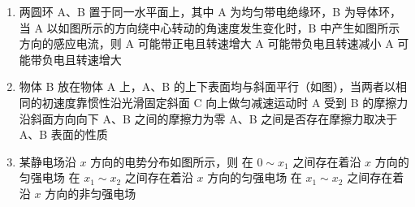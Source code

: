 \documentclass[\gkver]{gaokaozhenti}
\begin{document}
\begin{enumerate}
\item
两圆环 A、B 置于同一水平面上，其中 A 为均匀带电绝缘环，B 为导体环，当 A 以如图所示的方向绕中心转动的角速度发生变化时，B 中产生如图所示方向的感应电流，则
\onepicture[w=2.61cm]{}
{A 可能带正电且转速增大}
{A 可能带负电且转速减小}
{A 可能带负电且转速增大}


\item
物体 B 放在物体 A 上，A、B 的上下表面均与斜面平行（如图），当两者以相同的初速度靠惯性沿光滑固定斜面 C 向上做匀减速运动时
\onepicture[w=3.62cm]{}
{A 受到 B 的摩擦力沿斜面方向向下}
{A、B 之间的摩擦力为零}
{A、B 之间是否存在摩擦力取决于 A、B 表面的性质}


\item
某静电场沿 $x$ 方向的电势分布如图所示，则
\onepicture[w=4.45cm]{}
{在 $0\sim x_{1}$ 之间存在着沿 $x$ 方向的匀强电场}
{在 $x_{1}\sim x_{2}$ 之间存在着沿 $x$ 方向的匀强电场}
{在 $x_{1}\sim x_{2}$ 之间存在着沿 $x$ 方向的非匀强电场}



\end{enumerate}
\end{document}

